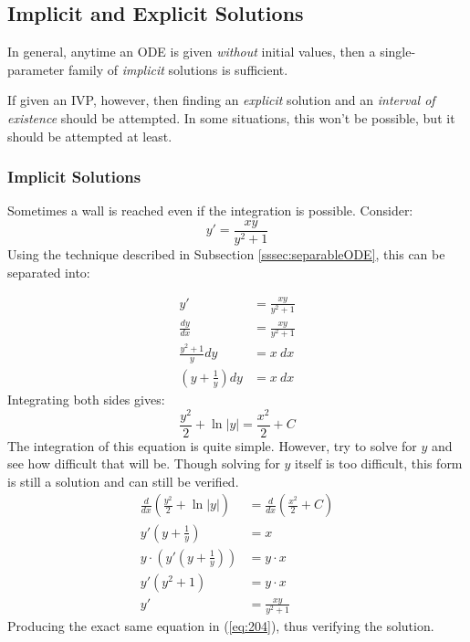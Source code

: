 \documentclass[12pt]{article}
\begin{document}
\subsection{Implicit and Explicit Solutions}
\label{ssec:implicitAndExplicitSolutions}

In general, anytime an ODE is given \textit{without} initial values, then a single-parameter family of \textit{implicit} solutions is sufficient.

If given an IVP, however, then finding an \textit{explicit} solution and an \textit{interval of existence} should be attempted. In some situations, this won't be possible, but it should be attempted at least.

\subsubsection{Implicit Solutions}
\label{sssec:implicitSolution}

Sometimes a wall is reached even if the integration is possible. Consider:
\begin{equation}
  y' = \frac{xy}{y^2 + 1}
  \label{eq:204}
\end{equation}
Using the technique described in Subsection \ref{sssec:separableODE}, this can be separated into:

\begin{align*}
  y' &= \frac{xy}{y^2 + 1} \\
  \frac{dy}{dx} &= \frac{xy}{y^2 + 1} \\
  \frac{y^2 + 1}{y}dy  &= x\ dx \\
  \left(y+\frac{1}{y}\right)dy  &= x\ dx
\end{align*}
Integrating both sides gives:
\begin{equation*}
  \frac{y^2}{2} + \ln|y| = \frac{x^2}{2} + C
\end{equation*}
The integration of this equation is quite simple. However, try to solve for $y$ and see how difficult that will be. Though solving for $y$ itself is too difficult, this form is still a solution and can still be verified.
\begin{align*}
  \frac{d}{dx}\left(\frac{y^2}{2} + \ln|y|\right) &= \frac{d}{dx}\left(\frac{x^2}{2} + C\right) \\
  y'\left(y + \frac{1}{y}\right) &= x \\
  y \cdot \left(y'\left(y + \frac{1}{y}\right) \right) &= y \cdot x \\
  y'\left(y^2 + 1\right) &= y \cdot x \\
  y' &= \frac{xy}{y^2 + 1}
\end{align*}
Producing the exact same equation in (\ref{eq:204}), thus verifying the solution.
\end{document}
